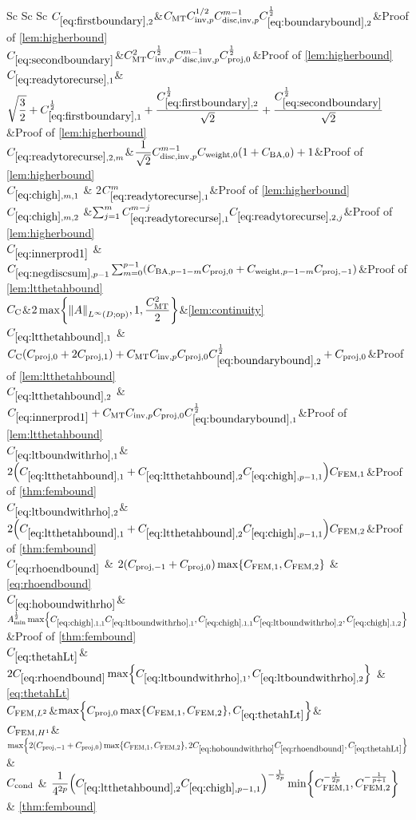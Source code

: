 \begin{longtabu}{Sc Sc Sc}
  $\CBt$&$\CMT \CinvVhp^{1/2} \Chinv^{m-1} \Cboundaryt^{\half}$&Proof of \cref{lem:higherbound}\\
  $\CBth$&$C_{\mathrm{MT}}^2 C_{\mathrm{inv},p}^{\frac{1}{2}} C_{\mathrm{disc},\mathrm{inv},p}^{m-1}C_{\mathrm{proj},0}^{\frac{1}{2}}$&Proof of \cref{lem:higherbound}\\
  $\CReco$&$\displaystyle\sqrt{\frac32} + \CBo^{\half} + \frac{\CBt^{\half}}{\sqrt{2}}+ \frac{\CBth^{\half}}{\sqrt{2}}$&Proof of \cref{lem:higherbound}\\
  $\CRectfn{m}$&$\displaystyle\frac1{\sqrt{2}}\Chinv^{m-1}\Cwfn{0}\mleft(1+\CSZfn{0}\mright)+1$&Proof of \cref{lem:higherbound}\\
  $\Chighmo$ & 2$\CReco^m$&Proof of \cref{lem:higherbound}\\
  $\Chighmt$ &$\sum_{j=1}^{m}\CReco^{m-j} \CRectfn{j}$&Proof of \cref{lem:higherbound}\\
  $\Cfourteen$ &$\Csumfn{p-1}\sum_{m=0}^{p-1} \mleft(\CSZfn{p-1-m}\Cmmofn{0} + \Cwfn{p-1-m} \Cmmofn{-1}\mright)$&Proof of \cref{lem:ltthetahbound}\\
    $C_{\mathrm{C}}$&$\displaystyle2\max\set{\NLiDop{A},1,\frac{\CMT^2}2}$&\cref{lem:continuity}\\
  $\Cfirst$ &$\Cc\mleft(\Cmmofn{0} + 2\Cmmofn{1}\mright) + \CMT \CinvVhp \Cmmofn{0} \Cboundaryt^{\half} + \Cmmofn{0}$&Proof of \cref{lem:ltthetahbound}\\
    $\Csecond$ &$\Cfourteen  + \CMT \CinvVhp \Cmmofn{0}\Cboundaryo^{\half}$&Proof of \cref{lem:ltthetahbound}\\
  $\CLtboundo$&$ 2\mleft(\Cfirst + \Csecond\Chighfn{p-1,1}\mright)\CFEMo$&Proof of \cref{thm:fembound}\\
  $\CLtboundt$&$2\mleft(\Cfirst + \Csecond\Chighfn{p-1,1}\mright)\CFEMt$&Proof of \cref{thm:fembound}\\
  $\Crhoendbound$ & $2\mleft(\Cmmofn{-1} + \Cmmofn{0}\mright)\max\set{\CFEMo,\CFEMt}$ & \cref{eq:rhoendbound}\\
  $\CHobound$&$\Amin^{\half}\max\set{\Chighfn{1,1}\CLtboundo,\Chighfn{1,1}\CLtboundt,\Chighfn{1,2}}$&Proof of \cref{thm:fembound}\\
      $\CthetahLt$& $2\Crhoendbound \max\set{\CLtboundo,\CLtboundt} $ & \cref{eq:thetahLt}\\
  $C_{\mathrm{FEM},L^{2}}$&$\max\set{\Cmmofn{0}\max\set{\CFEMo,\CFEMt},\CthetahLt}$&\\
$C_{\mathrm{FEM},H^{1}}$&$\max\set{2\mleft(\Cmmofn{-1}+\Cmmofn{0}\mright)\max\set{\CFEMo,\CFEMt},2\CHobound\Crhoendbound,\CthetahLt} $&\\
    $C_{\mathrm{cond}}$ & $\displaystyle\frac1{4^{2p}} \mleft(\Csecond\Chighfn{p-1,1}\mright)^{-\frac1{2p}} \min\set{\CFEMo^{-\frac1{2p}},\CFEMt^{-\frac1{p+1}}}$ & \cref{thm:fembound}\\
\bottomrule
\end{longtabu}
